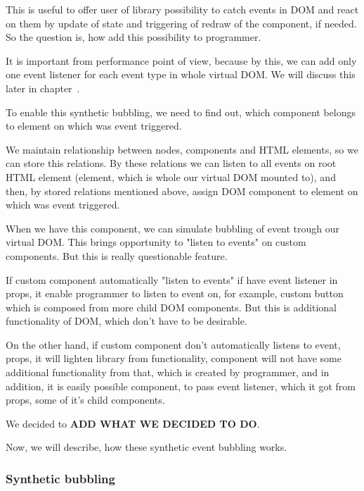 \documentclass[oneside, 12pt]{book}
\begin{document}
    This is useful to offer user of library possibility to catch events in DOM and react on them by update of state 
    and triggering of redraw of the component, if needed. So the question is, how add this possibility to programmer.

    It is important from performance point of view, because by this, we can add only one event listener for each event type in whole virtual DOM.
    We will discuss this later in chapter~.

    To enable this synthetic bubbling, we need to find out, which component belongs to element on which was event triggered.

    We maintain relationship between nodes, components and HTML elements, so we can store this relations.
    By these relations we can listen to all events on root HTML element 
    (element, which is whole our virtual DOM mounted to), 
    and then, by stored relations mentioned above, assign DOM component to element on which was event triggered.

    When we have this component, we can simulate bubbling of event trough our virtual DOM. 
    This brings opportunity to "listen to events" on custom components. 
    But this is really questionable feature.

    If custom component automatically "listen to events" if have event listener in props, 
    it enable programmer to listen to event on, for example, custom button which is composed from more child DOM components.
    But this is additional functionality of DOM, which don't have to be desirable. 

    On the other hand, if custom component don't automatically listens to event, props, it will lighten library from functionality, 
    component will not have some additional functionality from that, which is created by programmer, 
    and in addition, it is easily possible component, to pass event listener, which it got from props, some of it's child components.
    
    We decided to \textbf{ADD WHAT WE DECIDED TO DO}.

    Now, we will describe, how these synthetic event bubbling works.

    \subsubsection{Synthetic bubbling}\label{subsec:our-architecture-events-bubbling}
\end{document}
